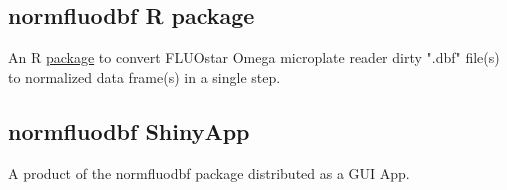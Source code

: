 \documentclass[
	10pt, %
]{FreemanCV}
\begin{document}
\begin{paracol}{2}
\subsection{normfluodbf R package}
An R \href{https://www.cran-e.com/package/normfluodbf}{package} to convert FLUOstar Omega microplate reader dirty ".dbf" file(s) to normalized data frame(s) in a single step.

\subsection{normfluodbf ShinyApp}
A product of the normfluodbf package distributed as a GUI App.

\end{paracol} %

\end{document}
